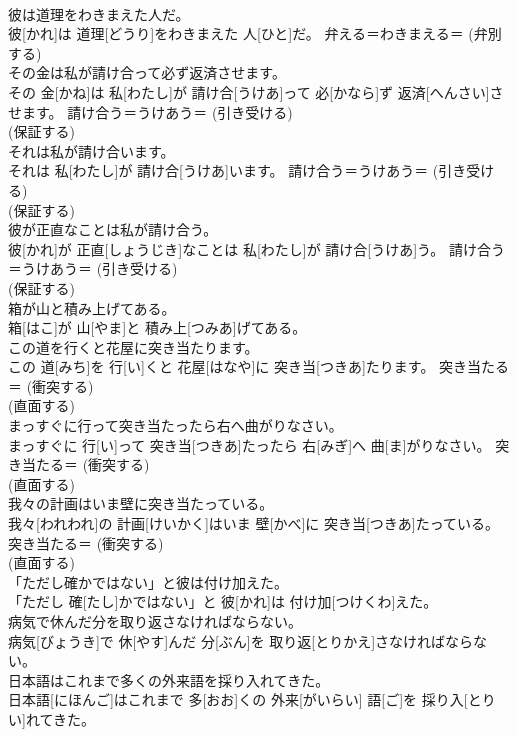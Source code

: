 \documentclass[8pt]{extreport}
\begin{document}
\begin{CJK}{UTF8}{min}
{\\	彼は道理をわきまえた人だ。	
\\	彼[かれ]は 道理[どうり]をわきまえた 人[ひと]だ。	弁える＝わきまえる＝ (弁別する) 
\\	その金は私が請け合って必ず返済させます。	
\\	その 金[かね]は 私[わたし]が 請け合[うけあ]って 必[かなら]ず 返済[へんさい]させます。	請け合う＝うけあう＝ (引き受ける) 
\\	(保証する) 
\\	それは私が請け合います。	
\\	それは 私[わたし]が 請け合[うけあ]います。	請け合う＝うけあう＝ (引き受ける) 
\\	(保証する) 
\\	彼が正直なことは私が請け合う。	
\\	彼[かれ]が 正直[しょうじき]なことは 私[わたし]が 請け合[うけあ]う。	請け合う＝うけあう＝ (引き受ける) 
\\	(保証する) 
\\	箱が山と積み上げてある。	
\\	箱[はこ]が 山[やま]と 積み上[つみあ]げてある。	
\\	この道を行くと花屋に突き当たります。	
\\	この 道[みち]を 行[い]くと 花屋[はなや]に 突き当[つきあ]たります。	突き当たる＝ (衝突する) 
\\	(直面する) 
\\	まっすぐに行って突き当たったら右へ曲がりなさい。	
\\	まっすぐに 行[い]って 突き当[つきあ]たったら 右[みぎ]へ 曲[ま]がりなさい。	突き当たる＝ (衝突する) 
\\	(直面する) 
\\	我々の計画はいま壁に突き当たっている。	
\\	我々[われわれ]の 計画[けいかく]はいま 壁[かべ]に 突き当[つきあ]たっている。	突き当たる＝ (衝突する) 
\\	(直面する) 
\\	「ただし確かではない」と彼は付け加えた。	
\\	「ただし 確[たし]かではない」と 彼[かれ]は 付け加[つけくわ]えた。	
\\	病気で休んだ分を取り返さなければならない。	
\\	病気[びょうき]で 休[やす]んだ 分[ぶん]を 取り返[とりかえ]さなければならない。	
\\	日本語はこれまで多くの外来語を採り入れてきた。	
\\	日本語[にほんご]はこれまで 多[おお]くの 外来[がいらい] 語[ご]を 採り入[とりい]れてきた。	
}
\end{CJK}
\end{document}
